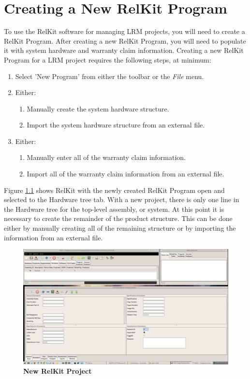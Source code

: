 \documentclass[11pt, 12pt, twoside, onecolumn]{book}
\begin{document}
\chapter{Creating a New RelKit Program}
\FloatBarrier
\noindent To use the RelKit software for managing LRM projects, you will need to create a RelKit Program.  After creating a new RelKit Program, you will need to populate it with system hardware and warranty claim information.  Creating a new RelKit Program for a LRM project requires the following steps, at minimum:

	\begin{enumerate}
		\item Select 'New Program' from either the toolbar or the \textit{File} menu.
		\item Either:
		\begin{enumerate}
			\item Manually create the system hardware structure.
			\item Import the system hardware structure from an external file.
		\end{enumerate}
		\item Either:
		\begin{enumerate}
			\item Manually enter all of the warranty claim information.
			\item Import all of the warranty claim information from an external file.
		\end{enumerate}
	\end{enumerate}

\noindent Figure \ref{fig:new_project_hardware} shows RelKit with the newly created RelKit Program open and selected to the Hardware tree tab.  With a new project, there is only one line in the Hardware tree for the top-level assembly, or system.  At this point it is necessary to create the remainder of the product structure.  This can be done either by manually creating all of the remaining structure or by importing the information from an external file. \\

\begin{landscape}
		\begin{figure}[htbp]
			\centering
			\includegraphics[width=18cm]{./figures/new_project_hardware}
			\caption{\textbf{New RelKit Project}}
			\label{fig:new_project_hardware}
		\end{figure}
\end{landscape}
\end{document}
